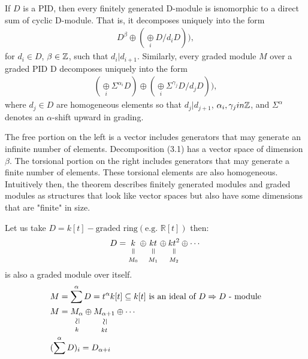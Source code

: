 \documentclass[11pt,a4paper]{report}
\newcommand{\verteq}{\rotatebox{90}{$\,=$}}
\newcommand{\vertsimeq}{\rotatebox{90}{$\,\simeq$}}
\newcommand{\equalto}[2]{\underset{\scriptstyle\overset{\mkern4mu\verteq}{#2}}{#1}}
\newcommand{\simequalto}[2]{\underset{\scriptstyle\overset{\mkern4mu\vertsimeq}{#2}}{#1}}
\begin{document}
              \begin{thm}  \label{Structure}
              If $D$ is a PID, then every finitely generated D-module is isnomorphic to a direct sum of cyclic D-module. That is, it decomposes uniquely into the form
              \begin{align}
                D^\beta \oplus (\underset{i}{\oplus} D/d_iD)),
              \end{align}
              for $d_i \in D$, $\beta \in \mathbb{Z}$, such that $d_i| d_{i+1}.$ Similarly, every graded module $M$ over a graded PID D decomposes uniquely into the form
               \begin{align}
                (\underset{i}{\oplus} \Sigma^{\alpha_i} D) \oplus (\underset{i}{\oplus} \Sigma ^{\gamma_j} D/d_jD)),
              \end{align}
              where $d_j \in D$ are homogeneous elements so that $d_j|d_{j+1}$, $\alpha_i, \gamma_j in \mathbb{Z}$, and $\Sigma^\alpha$ denotes an $\alpha$-shift upward in grading.
              \end{thm}
              The free portion on the left is a vector includes generators that may generate an infinite number of elements. Decomposition (3.1) has a vector space of dimension $\beta$. The torsional portion on the right includes generators that
               may generate a finite number of elements. These torsional elements are also homogeneous. Intuitively then, the theorem describes finitely generated modules and graded modules as structures that look like vector spaces but also
                have some dimensions that are "finite" in size.
              
             
              \begin{Ex}
               Let us take $D = k[t] - \textrm{graded ring} (\textrm{e.g. } \mathbb{R}[t])$
               then: 
               \[
                D = \equalto{k}{M_0} \oplus \equalto{kt}{M_1} \oplus \equalto{kt^2}{M_2} \oplus \cdots
                \]
                is also a graded module over itself.
              \begin{align*}
                &M = \sum^\alpha D = t^\alpha k[t] \subseteq k[t] \textrm{  is an ideal of } D \Rightarrow D \textrm{ - module}\\
                &M = \simequalto{M_\alpha}{k} \oplus \simequalto{M_{\alpha+1}}{kt} \oplus \cdots\\
                &(\sum^\alpha D)_i = D_{\alpha+i}\\
              \end{align*}
              \end{Ex}
              
\end{document}
